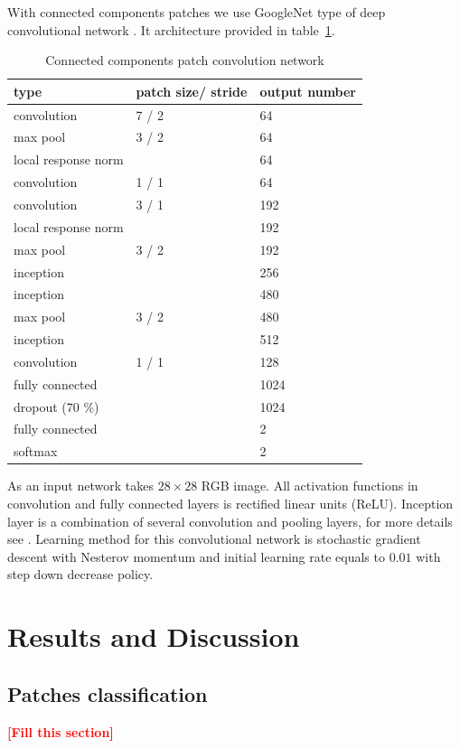 \documentclass[conference,a4paper,twocolumn]{IEEEtran}
\newcommand{\todo}[1]{\textcolor{red}{\textbf{[#1]}}} %
\begin{document}
With connected components patches we use GoogleNet type of deep convolutional network \cite{Googlenet}. It architecture provided in table~\ref{googlenet_tab}. 
\begin{table}[!h]
\centering
\caption{Connected components patch convolution network}
\label{googlenet_tab}
\begin{tabular}{|l|p{1.3cm}|p{1.3cm}|}
\hline
\textbf{type} & \textbf{patch size/ stride} & \textbf{output number}  \\
\hline
convolution & 7 / 2 & 64 \\
\hline
max pool & 3 / 2 & 64 \\
\hline
local response norm & & 64 \\
\hline
convolution & 1 / 1 & 64 \\
\hline
convolution & 3 / 1 & 192 \\
\hline
local response norm & & 192 \\
\hline
max pool & 3 / 2 & 192 \\
\hline
inception &  & 256 \\
\hline
inception &  & 480 \\
\hline
max pool & 3 / 2 & 480 \\
\hline
inception &  & 512 \\
\hline
convolution & 1 / 1 & 128 \\
\hline
fully connected & & 1024 \\
\hline
dropout (70 \%) & & 1024 \\
\hline
fully connected & & 2 \\
\hline
softmax & & 2 \\
\hline
\end{tabular}
\end{table}

As an input network takes $28\times28$ RGB image. All activation functions in convolution and fully connected layers is rectified linear units (ReLU). Inception layer is a combination of several convolution and pooling layers, for more details see \cite{Googlenet}. Learning method for this convolutional network is stochastic gradient descent with Nesterov momentum and initial learning rate equals to $0.01$ with step down decrease policy. 

\section{Results and Discussion}

\subsection{Patches classification}
\todo{Fill this section}
\end{document}
